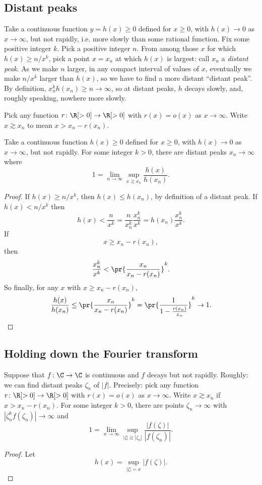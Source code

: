 \subsection{Distant peaks}
Take a continuous function \(y=h(x)\ge 0\) defined for \(x\ge 0\), with \(h(x) \to 0\) as \(x \to \infty\), but not rapidly, i.e. more slowly than some rational function.
Fix some positive integer \(k\).
Pick a positive integer \(n\). 
From among those \(x\) for which \(h(x) \ge n/x^k\), pick a point \(x=x_n\) at which \(h(x)\) is largest: call \(x_n\) a \emph{distant peak}.
As we make \(n\) larger, in any compact interval of values of \(x\), eventually we make \(n/x^k\) larger than \(h(x)\), so we have to find a more distant ``distant peak''.
By definition, \(x_n^k h(x_n) \ge n \to \infty\), so at distant peaks, \(h\) decays slowly, and, roughly speaking, nowhere more slowly.
\begin{center}

\end{center}
\begin{lemma}
Pick any function \(r \colon \R[> 0] \to \R[> 0]\) with \(r(x)=o(x)\) as \(x \to \infty\).
Write \(x\gtrsim x_n\) to mean \(x>x_n-r(x_n)\).

Take a continuous function \(h(x)\ge 0\) defined for \(x\ge 0\), with \(h(x) \to 0\) as \(x \to \infty\), but not rapidly.
For some integer \(k>0\), there are distant peaks \(x_n \to \infty\) where
\[
1 = \lim_{n \to \infty} \sup_{x\gtrsim x_n} \frac{h(x)}{h(x_n)}.
\]
\end{lemma}
\begin{proof}
If \(h(x) \ge n/x^k\), then \(h(x)\le h(x_n)\), by definition of a distant peak.
If \(h(x) < n/x^k\) then 
\[
h(x) < \frac{n}{x^k} = \frac{n}{x_n^k} \frac{x_n^k}{x^k} = h(x_n) \frac{x_n^k}{x^k}.
\]
If
\[
x \ge x_n-r(x_n),
\]
then
\[
\frac{x_n^k}{x^k} < \pr{\frac{x_n}{x_n-r(x_n)}}^k.
\]
So finally, for any \(x\) with \(x \ge x_n-r(x_n)\), 
\[
\frac{h(x)}{h(x_n)} \le \pr{\frac{x_n}{x_n-r(x_n)}}^k = \pr{\frac{1}{1-\frac{r(x_n)}{x_n}}}^k\to 1.
\]
\end{proof}

\subsection{Holding down the Fourier transform}
\begin{lemma}
Suppose that \(f \colon \C \to \C\) is continuous and \(f\) decays but not rapidly.
Roughly: we can find distant peaks \(\zeta_n\) of \(|f|\).
Precisely: pick any function \(r \colon \R[> 0] \to \R[> 0]\) with \(r(x)=o(x) \) as \(x \to \infty\).
Write \(x\gtrsim x_n\) if \(x>x_n-r(x_n)\).
For some integer \(k>0\), there are points \(\zeta_n \to \infty\) with \(|\zeta_n^k f(\zeta_n)| \to \infty\) and
\[
1 = \lim_{n \to \infty} \sup_{|\zeta|\gtrsim|\zeta_n|} \frac{|f(\zeta)|}{|f(\zeta_n)|}.
\]
\end{lemma}
\begin{proof}
Let 
\[
h(x) = \sup_{|\zeta|=x} |f(\zeta)|.
\]
\end{proof}

